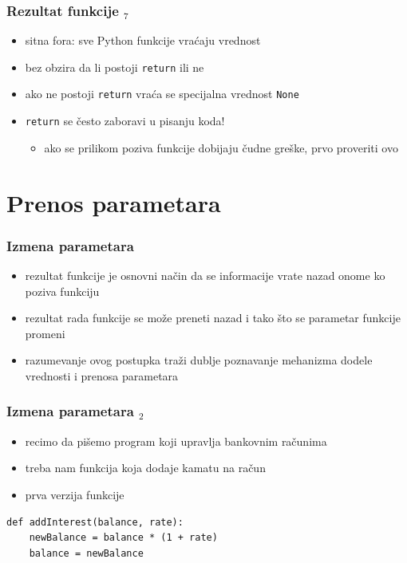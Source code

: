 \documentclass[utf8,compress]{beamer}
\begin{document}
\begin{frame}[fragile]
  \frametitle{Rezultat funkcije $_7$}
  \begin{itemize}
    \item sitna fora: sve Python funkcije vraćaju vrednost
    \item bez obzira da li postoji \texttt{return} ili ne
    \item ako ne postoji \texttt{return} vraća se specijalna vrednost \texttt{None}
    \item \texttt{return} se često zaboravi u pisanju koda!
    \begin{itemize}
      \item ako se prilikom poziva funkcije dobijaju čudne greške, prvo proveriti ovo
    \end{itemize}
  \end{itemize}
\end{frame}

\section{Prenos parametara}

\begin{frame}[fragile]
  \frametitle{Izmena parametara}
  \begin{itemize}
    \item rezultat funkcije je osnovni način da se informacije vrate nazad onome ko poziva funkciju
    \item rezultat rada funkcije se može preneti nazad i tako što se parametar funkcije promeni
    \item razumevanje ovog postupka traži dublje poznavanje mehanizma dodele vrednosti i prenosa parametara
  \end{itemize}
\end{frame}

\begin{frame}[fragile]
  \frametitle{Izmena parametara $_2$}
  \begin{itemize}
    \item recimo da pišemo program koji upravlja bankovnim računima
    \item treba nam funkcija koja dodaje kamatu na račun
    \item prva verzija funkcije
  \end{itemize}
\begin{verbatim}
def addInterest(balance, rate):
    newBalance = balance * (1 + rate)
    balance = newBalance
\end{verbatim}
\end{frame}
\end{document}
